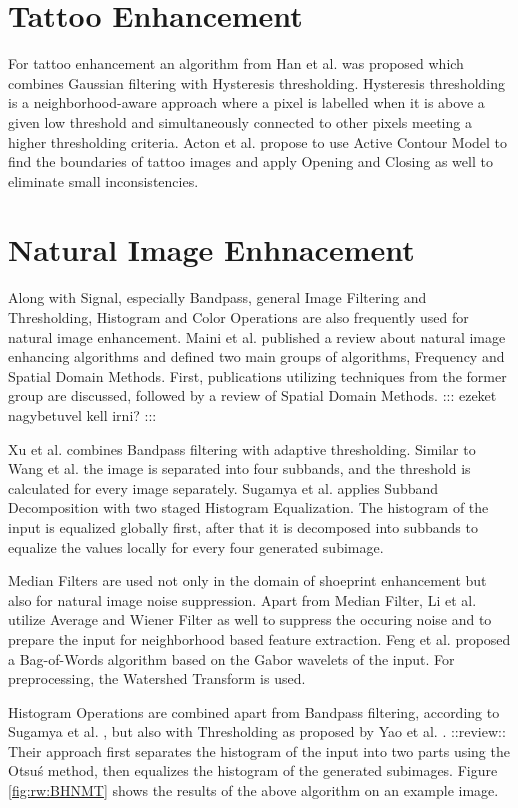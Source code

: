 \documentclass[draft,final]{vutinfth} %
\begin{document}
\section*{Tattoo Enhancement}

For tattoo enhancement an algorithm from Han et al. \cite{han2013tattoo} was proposed which combines Gaussian filtering with Hysteresis thresholding. 
Hysteresis thresholding is a neighborhood-aware approach where a pixel is labelled when it is above a given low threshold and simultaneously connected to other pixels meeting a higher thresholding criteria.
Acton et al. \cite{acton2008matching} propose to use Active Contour Model to find the boundaries of tattoo images and apply Opening and Closing as well to eliminate small inconsistencies.

\section*{Natural Image Enhnacement}
\par
Along with Signal, especially Bandpass, general Image Filtering and Thresholding, Histogram and Color Operations are also frequently used for natural image enhancement.
Maini et al. \cite{maini2010comprehensive} published a review about natural image enhancing algorithms and defined two main groups of algorithms, Frequency and Spatial Domain Methods.
First, publications utilizing techniques from the former group are discussed, followed by a review of Spatial Domain Methods. ::: ezeket nagybetuvel kell irni? :::
\par
Xu et al. \cite{xu2016image} combines Bandpass filtering with adaptive thresholding.
Similar to Wang et al. \cite{wang2014enhanced} the image is separated into four subbands, and the threshold is calculated for every image separately.
Sugamya et al. \cite{sugamya2016image} applies Subband Decomposition with two staged Histogram Equalization.
The histogram of the input is equalized globally first, after that it is decomposed into subbands to equalize the values locally for every four generated subimage.
\par
Median Filters are used not only in the domain of shoeprint enhancement \cite{alizadeh2017automatic} but also for natural image noise suppression.
Apart from Median Filter, Li et al. \cite{li2014rapid} utilize Average and Wiener Filter as well to suppress the occuring noise and to prepare the input for neighborhood based feature extraction.
Feng et al. \cite{feng2011bag} proposed a Bag-of-Words algorithm based on the Gabor wavelets of the input. 
For preprocessing, the Watershed Transform is used.
\par
Histogram Operations are combined apart from Bandpass filtering, according to Sugamya et al. \cite{sugamya2016image}, but also with Thresholding as proposed by Yao et al. \cite{yao2016image}. ::review::
Their approach first separates the histogram of the input into two parts using the Otsu\'s method, then equalizes the histogram of the generated subimages. 
Figure \ref{fig:rw:BHNMT} shows the results of the above algorithm on an example image.
\end{document}
